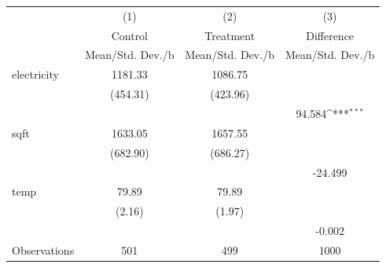 {
\def\sym#1{\ifmmode^{#1}\else\(^{#1}\)\fi}
\begin{tabular}{l*{3}{c}}
\hline\hline
                    &\multicolumn{1}{c}{(1)}&\multicolumn{1}{c}{(2)}&\multicolumn{1}{c}{(3)}\\
                    &\multicolumn{1}{c}{Control}&\multicolumn{1}{c}{Treatment}&\multicolumn{1}{c}{Difference}\\
                    &Mean/Std. Dev./b&Mean/Std. Dev./b&Mean/Std. Dev./b         \\
\hline
electricity         &     1181.33&     1086.75&                     \\
                    &    (454.31)&    (423.96)&                     \\
                    &            &            &      94.584\sym{***}\\
sqft                &     1633.05&     1657.55&                     \\
                    &    (682.90)&    (686.27)&                     \\
                    &            &            &     -24.499         \\
temp                &       79.89&       79.89&                     \\
                    &      (2.16)&      (1.97)&                     \\
                    &            &            &      -0.002         \\
\hline
Observations        &         501&         499&        1000         \\
\hline\hline
\end{tabular}
}
